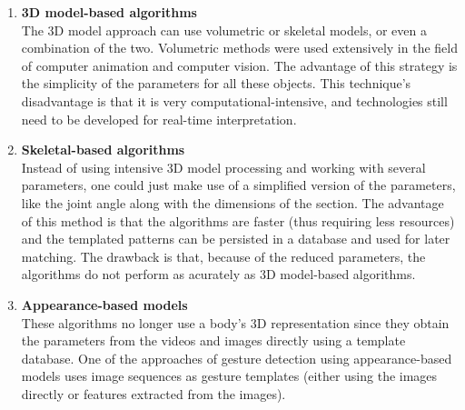 \documentclass[12pt,a4paper,twoside]{report}
\begin{document}
\begin{enumerate}
  \item \textbf{3D model-based algorithms} \\
    The 3D model approach can use volumetric or skeletal models, or even a combination of the two. Volumetric methods were used extensively in the field of computer animation and computer vision. The advantage of this strategy is the simplicity of the parameters for all these objects. This technique's disadvantage is that it is very computational-intensive, and technologies still need to be developed for real-time interpretation.

  \item \textbf{Skeletal-based algorithms} \\
    Instead of using intensive 3D model processing and working with several parameters, one could just make use of a simplified version of the parameters, like the joint angle along with the dimensions of the section. The advantage of this method is that the algorithms are faster (thus requiring less resources) and the templated patterns can be persisted in a database and used for later matching. The drawback is that, because of the reduced parameters, the algorithms do not perform as acurately as 3D model-based algorithms.

  \item \textbf{Appearance-based models} \\
    These algorithms no longer use a body's 3D representation since they obtain the parameters from the videos and images directly using a template database. One of the approaches of gesture detection using appearance-based models uses image sequences as gesture templates (either using the images directly or features extracted from the images).
\end{enumerate}
\end{document}
